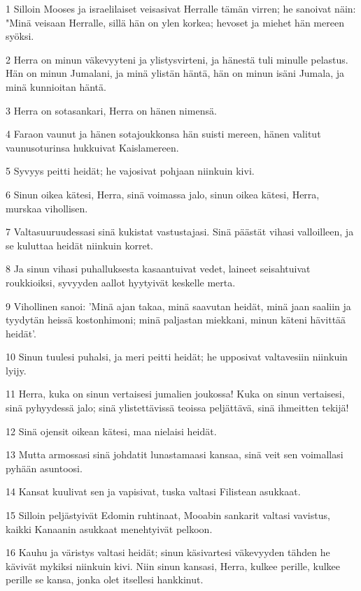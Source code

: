 \par 1 Silloin Mooses ja israelilaiset veisasivat Herralle tämän virren; he sanoivat näin: "Minä veisaan Herralle, sillä hän on ylen korkea; hevoset ja miehet hän mereen syöksi.
\par 2 Herra on minun väkevyyteni ja ylistysvirteni, ja hänestä tuli minulle pelastus. Hän on minun Jumalani, ja minä ylistän häntä, hän on minun isäni Jumala, ja minä kunnioitan häntä.
\par 3 Herra on sotasankari, Herra on hänen nimensä.
\par 4 Faraon vaunut ja hänen sotajoukkonsa hän suisti mereen, hänen valitut vaunusoturinsa hukkuivat Kaislamereen.
\par 5 Syvyys peitti heidät; he vajosivat pohjaan niinkuin kivi.
\par 6 Sinun oikea kätesi, Herra, sinä voimassa jalo, sinun oikea kätesi, Herra, murskaa vihollisen.
\par 7 Valtasuuruudessasi sinä kukistat vastustajasi. Sinä päästät vihasi valloilleen, ja se kuluttaa heidät niinkuin korret.
\par 8 Ja sinun vihasi puhalluksesta kasaantuivat vedet, laineet seisahtuivat roukkioiksi, syvyyden aallot hyytyivät keskelle merta.
\par 9 Vihollinen sanoi: 'Minä ajan takaa, minä saavutan heidät, minä jaan saaliin ja tyydytän heissä kostonhimoni; minä paljastan miekkani, minun käteni hävittää heidät'.
\par 10 Sinun tuulesi puhalsi, ja meri peitti heidät; he upposivat valtavesiin niinkuin lyijy.
\par 11 Herra, kuka on sinun vertaisesi jumalien joukossa! Kuka on sinun vertaisesi, sinä pyhyydessä jalo; sinä ylistettävissä teoissa peljättävä, sinä ihmeitten tekijä!
\par 12 Sinä ojensit oikean kätesi, maa nielaisi heidät.
\par 13 Mutta armossasi sinä johdatit lunastamaasi kansaa, sinä veit sen voimallasi pyhään asuntoosi.
\par 14 Kansat kuulivat sen ja vapisivat, tuska valtasi Filistean asukkaat.
\par 15 Silloin peljästyivät Edomin ruhtinaat, Mooabin sankarit valtasi vavistus, kaikki Kanaanin asukkaat menehtyivät pelkoon.
\par 16 Kauhu ja väristys valtasi heidät; sinun käsivartesi väkevyyden tähden he kävivät mykiksi niinkuin kivi. Niin sinun kansasi, Herra, kulkee perille, kulkee perille se kansa, jonka olet itsellesi hankkinut.
